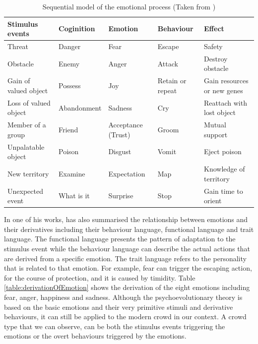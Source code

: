\begin{table}
\caption{Sequential model of the emotional process (Taken from \citet{plutchik2001integration})}
\label{table:sequentialModelOfEmotion}
\centering
\begin{tabular}{|p{2.5cm}|p{2.3cm}|p{2.3cm}|p{2.3cm}|p{3.5cm}|}
\hline
\textbf{Stimulus events} & \textbf{Coginition} & \textbf{Emotion} & \textbf{Behaviour} & \textbf{Effect} \\
\hline
Threat & Danger & Fear & Escape & Safety \\
\hline
Obstacle & Enemy & Anger & Attack & Destroy obstacle \\
\hline
Gain of valued object & Possess & Joy & Retain or repeat & Gain resources or new genes \\
\hline
Loss of valued object & Abandonment & Sadness & Cry & Reattach with lost object \\
\hline
Member of a group & Friend & Acceptance (Trust) & Groom & Mutual support \\
\hline
Unpalatable object & Poison & Disgust & Vomit & Eject poison \\
\hline
New territory & Examine & Expectation & Map & Knowledge of territory \\
\hline
Unexpected event & What is it & Surprise & Stop & Gain time to orient \\
\hline
\end{tabular}
\end{table}

In one of his works, \citet{plutchik2001integration} has also summarised the relationship between emotions and their derivatives including their behaviour language, functional language and trait language. The functional language presents the pattern of adaptation to the stimulus event while the behaviour language can describe the actual actions that are derived from a specific emotion. The trait language refers to the personality that is related to that emotion. For example, fear can trigger the escaping action, for the course of protection, and it is caused by timidity. Table \ref{table:derivationOfEmotion} shows the derivation of the eight emotions including fear, anger, happiness and sadness. Although the psychoevolutionary theory is based on the basic emotions and their very primitive stimuli and derivative behaviours, it can still be applied to the modern crowd in our context. A crowd type that we can observe, can be both the stimulus events triggering the emotions or the overt behaviours triggered by the emotions. 

